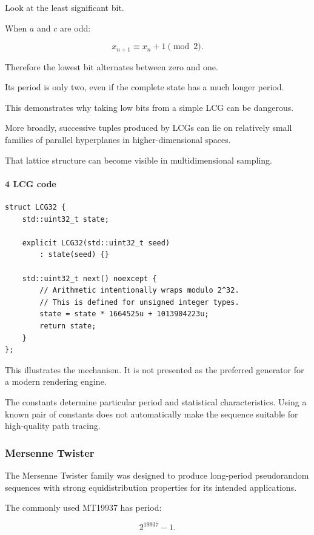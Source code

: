 Look at the least significant bit.

When \(a\) and \(c\) are odd:

\[
 x_{n+1}\equiv x_n+1\pmod2.
\]

Therefore the lowest bit alternates between zero and one.

Its period is only two, even if the complete state has a much longer period.

This demonstrates why taking low bits from a simple LCG can be dangerous.

More broadly, successive tuples produced by LCGs can lie on relatively small families of parallel hyperplanes in higher-dimensional spaces.

That lattice structure can become visible in multidimensional sampling.

\paragraph{4 LCG code}\label{lcg-code}

\begin{verbatim}
struct LCG32 {
    std::uint32_t state;

    explicit LCG32(std::uint32_t seed)
        : state(seed) {}

    std::uint32_t next() noexcept {
        // Arithmetic intentionally wraps modulo 2^32.
        // This is defined for unsigned integer types.
        state = state * 1664525u + 1013904223u;
        return state;
    }
};
\end{verbatim}

This illustrates the mechanism. It is not presented as the preferred generator for a modern rendering engine.

The constants determine particular period and statistical characteristics. Using a known pair of constants does not automatically make the sequence suitable for high-quality path tracing.

\subsubsection{Mersenne Twister}\label{mersenne-twister}

The Mersenne Twister family was designed to produce long-period pseudorandom sequences with strong equidistribution properties for its intended applications.

The commonly used MT19937 has period:

\[
 \boxed{2^{19937}-1}.
\]

